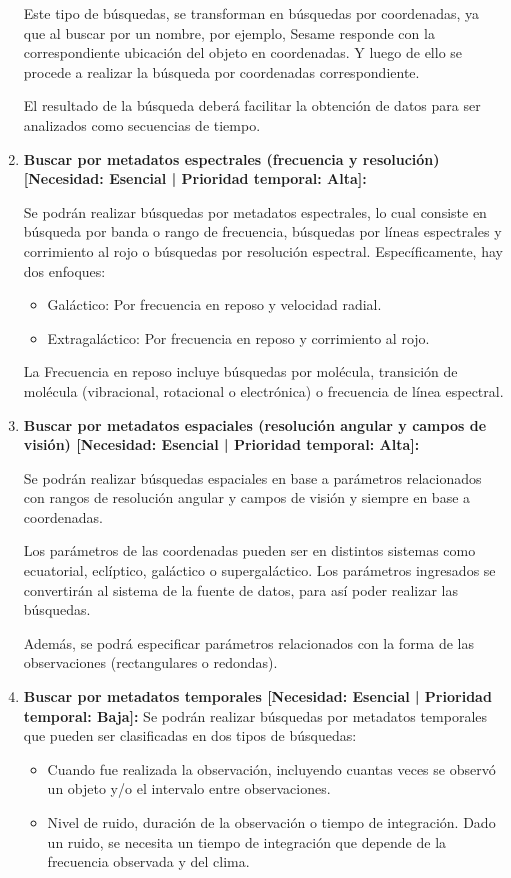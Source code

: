 \begin{enumerate}
Este tipo de búsquedas, se transforman en búsquedas por coordenadas, ya que al
buscar por un nombre, por ejemplo, Sesame responde con la correspondiente
ubicación del objeto en coordenadas. Y luego de ello se procede a realizar la
búsqueda por coordenadas correspondiente.

El resultado de la búsqueda deberá facilitar la obtención de datos para ser
analizados como secuencias de tiempo.

	\item \textbf{Buscar por metadatos espectrales (frecuencia y
resolución) [Necesidad: Esencial | Prioridad temporal: Alta]:}

Se podrán realizar búsquedas por metadatos espectrales, lo cual consiste en
búsqueda por banda o rango de frecuencia, búsquedas por líneas espectrales y
corrimiento al rojo o búsquedas por resolución espectral. Específicamente, hay
dos enfoques:
\begin{itemize}
	\item Galáctico: Por frecuencia en reposo y velocidad radial.
	\item Extragaláctico: Por frecuencia en reposo y corrimiento al rojo.
\end{itemize}

La Frecuencia en reposo incluye búsquedas por molécula, transición de molécula
(vibracional, rotacional o electrónica) o frecuencia de línea espectral.

	\item \textbf{Buscar por metadatos espaciales (resolución angular y
campos de visión) [Necesidad: Esencial | Prioridad temporal: Alta]:}

Se podrán realizar búsquedas espaciales en base a parámetros relacionados con
rangos de  resolución angular y campos de visión y siempre en base a
coordenadas.

Los parámetros de las coordenadas pueden ser en distintos sistemas como
ecuatorial, eclíptico, galáctico o supergaláctico. Los parámetros ingresados se
convertirán al sistema de la fuente de datos, para así poder realizar las
búsquedas.

Además, se podrá especificar parámetros relacionados con la forma de las
observaciones (rectangulares o redondas).

	\item \textbf{Buscar por metadatos temporales [Necesidad: Esencial | Prioridad temporal: Baja]:}
Se podrán realizar búsquedas por metadatos temporales que pueden ser
clasificadas en dos tipos de búsquedas: 
\begin{itemize} 
\item Cuando fue realizada la observación, incluyendo cuantas veces se observó
un objeto y/o el intervalo entre observaciones.  
\item Nivel de ruido, duración de la observación o tiempo de integración. Dado
un ruido, se necesita un tiempo de integración que depende de la frecuencia
observada y del clima.  
\end{itemize}


\end{enumerate}
